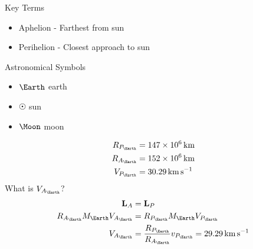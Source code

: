 \documentclass{article}
\begin{document}
Key Terms
\begin{itemize}
	\item Aphelion - Farthest from sun
	\item Perihelion - Closest approach to sun
\end{itemize}
Astronomical Symbols
\begin{itemize}
	\item $ \Earth $ \textleftarrow earth
	\item $ \Sun $ \textleftarrow sun
	\item $ \Moon $ \textleftarrow moon
\end{itemize}
\begin{align*}
	R_{P_{\Earth}} & = \SI{147e6}{\kilo \meter} \\
	R_{A_{\Earth}} & = \SI{152e6}{\kilo \meter} \\
	V_{P_{\Earth}} & = \SI{30.29}{\kilo \meter \per \second}
\end{align*}
What is $ V_{A_{\Earth}} $?
\begin{align*}
	\vect{L}_A & = \vect{L}_P \\
	R_{A_{\Earth}}M_{\Earth}V_{A_{\Earth}} & = R_{P_{\Earth}}M_{\Earth}V_{P_{\Earth}} \\
	V_{A_{\Earth}} & = \frac{ R_{P_{\Earth}} }{ R_{A_{\Earth}} }v_{P_{\Earth}} = \SI{29.29}{\kilo \meter \per \second}
\end{align*}
\end{document}
